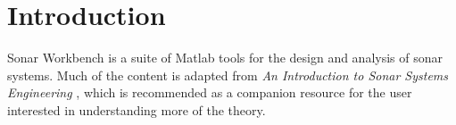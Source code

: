 \section{Introduction}\label{sec:intro}
Sonar Workbench is a suite of Matlab tools for the design and analysis of sonar systems. Much of the content is adapted from \emph{An Introduction to Sonar Systems Engineering} \cite{Ziomek}, which is recommended as a companion resource for the user interested in understanding more of the theory.